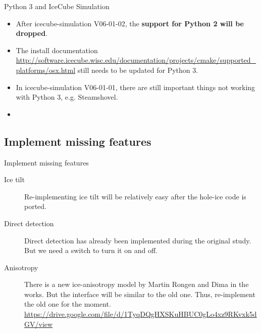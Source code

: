 \begin{frame}{\tobedone Python 3 and IceCube Simulation}
  \begin{itemize}
    \item After icecube-simulation V06-01-02, the \textbf{support for Python 2 will be dropped}.
    \item The install documentation \url{http://software.icecube.wisc.edu/documentation/projects/cmake/supported_platforms/osx.html} still needs to be updated for Python 3.
    \item In icecube-simulation V06-01-01, there are still important things not working with Python 3, e.g. Steamshovel.
    \item {}
  \end{itemize}

\end{frame}

\subsection{\tobedone Implement missing features}
\begin{frame}{\tobedone Implement missing features}
  \begin{description}
    \item[Ice tilt] Re-implementing ice tilt will be relatively easy after the hole-ice code is ported.
    \item[Direct detection] Direct detection has already been implemented during the original study. But we need a switch to turn it on and off.
    \item[Anisotropy] There is a new ice-anisotropy model by Martin Rongen and Dima in the works. But the interface will be similar to the old one. Thus, re-implement the old one for the moment. \url{https://drive.google.com/file/d/1TyqDQgHXSKuHBUC0gLo4xz9RKvxk5dGV/view}
  \end{description}
\end{frame}


